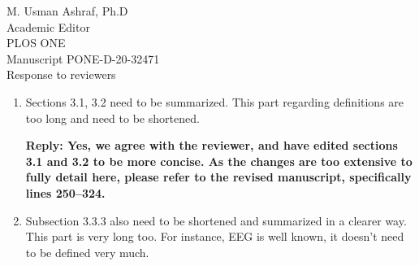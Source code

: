 \documentclass[10pt, letterpaper]{letter}
\newenvironment{QandA}
{\begin{enumerate}[
    label={\bfseries Comment \arabic*:}, 
    wide,
    ref={Comment \arabic*}]}
{\end{enumerate}}
\newenvironment{revised}[2]
{%
\begin{displayquote}
    \medskip
    \begin{flushright}
        \itshape{(Lines \numrange{#1}{#2} in the revised manuscript.)}\normalfont%
    \end{flushright}
    \medskip

}
{\end{displayquote}}
\newenvironment{answered}
{\medskip\par\bfseries Reply: \normalfont}
{\par\noindent\makebox[\linewidth]{\rule{\textwidth}{0.4pt}}\bigskip}
\begin{document}
\begin{letter}{
    M. Usman Ashraf, Ph.D\\
    Academic Editor\\
    PLOS ONE\\
    \medskip
    Manuscript PONE-D-20-32471\\
    Response to reviewers\\
}
\begin{QandA}
    \begin{answered}
        Agreed.
        We assume here that by \emph{sample} the reviewer refers to the \emph{participant population}.
        We have amended the text to specify that our participants correspond to undergraduate volunteers enrolled in an introductory-level psychology course at CMU:\@

        \begin{revised}{240}{250}

            This study was conducted with the approval of the Carnegie Mellon University Institutional Review Board under record number \texttt{STUDY2019\_00000247}.
            Written consent was obtained.\\

            Subjects were recruited from a pool of undergraduate students at Carnegie Mellon University.
            Students enrolled in an introductory-level psychology course fulfill a research requirement as part of the plan of study.
            This requirement may be fulfilled either through the elaboration of a written essay or by volunteering as a participant in a small number of research experiments.\\

            No particular exclusion criteria were applied, and as specified by our approved data-collection protocol, no gender- or sex-related statistics were collected.
            In total, 40 participants were recruited, all of them of college student age (\numrange{18}{25} years old).

        \end{revised}
    \end{answered}

    \item\label{it:shorten31} Sections 3.1, 3.2 need to be summarized.
    This part regarding definitions are too long and need to be shortened.

    \begin{answered}
        Yes, we agree with the reviewer, and have edited sections 3.1 and 3.2 to be more concise.
        As the changes are too extensive to fully detail here, please refer to the revised manuscript, specifically lines \numrange{250}{324}.
    \end{answered}

    \item\label{it:shorten333} Subsection 3.3.3 also need to be shortened and summarized in a clearer way.
    This part is very long too.
    For instance, EEG is well known, it doesn't need to be defined very much.


\end{QandA}
\end{letter}
\end{document}
